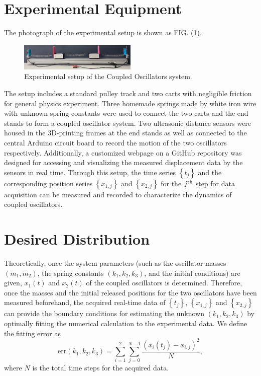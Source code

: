 \documentclass[12pt, a4paper, reprint, nofootinbib, twoside,  showkeys]{revtex4-1}
\begin{document}
\section{Experimental Equipment}
	The photograph of the experimental setup is shown as FIG. (\ref{fig:exp-system}).
	\begin{figure}[h]
	\centering
	\includegraphics[width=0.5\textwidth]{image/system_cleanup.jpg}
	\caption{Experimental setup of the Coupled Oscillators system.}
	\label{fig:exp-system}
	\end{figure}
	The setup includes a standard pulley track and two carts with negligible friction for general physics experiment. Three homemade springs made by white iron wire with unknown spring constants were used to connect the two carts and the end stands to form a coupled oscillator system. Two ultrasonic distance sensors were housed in the 3D-printing frames at the end stands as well as connected to the central Arduino circuit board to record the motion of the two oscillators respectively. Additionally, a customized webpage on a GitHub repository was designed for accessing and visualizing the measured displacement data by the sensors in real time. 
	Through this setup,  the time series $\left\{t_j\right\}$ and the corresponding position series $\left\{x_{1,j}\right\}$ and $\left\{x_{2,j}\right\}$ for the $j^{\rm th}$ step for data acquisition can be measured and recorded to characterize the dynamics of coupled oscillators. 

\section{Desired Distribution}
Theoretically, once the system parameters (such as the oscillator masses $\left(m_1,m_2\right)$, the spring constants $\left(k_1,k_2,k_3\right)$, and the initial conditions) are given, $x_1\left(t\right)$ and $x_2\left(t\right)$ of the coupled oscillators is determined. Therefore, once the masses and the initial released positions for the two oscillators have been measured beforehand, the acquired real-time data of $\left\{t_j\right\}$, $\left\{x_{1,j}\right\}$ and $\left\{x_{2,j}\right\}$ can provide the boundary conditions for estimating the unknown $\left(k_1,k_2,k_3\right)$ 
by optimally fitting the numerical calculation to the experimental data. We define the fitting error as
\begin{equation}
\mathrm{err}\left(k_1,k_2,k_3\right) = \sum_{i=1}^{2}\sum_{j=0}^{N-1}\frac{\left(x_i\left(t_j\right) - x_{i,j}\right)^2}{N},
\end{equation}
where $N$ is the total time steps for the acquired data.
\end{document}
